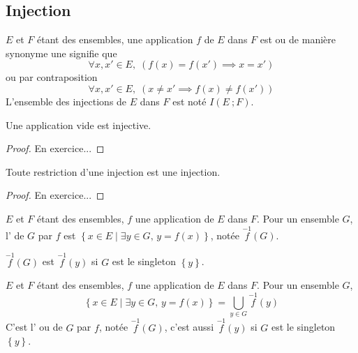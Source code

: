 \subsection{Injection}
\begin{definition}
[Injection]
\(𝐸\) et \(𝐹\) étant des ensembles, une application \(𝑓\) de
\(𝐸\) dans \(𝐹\) est  ou de manière synonyme une
 signifie que
\begin{equation*}
∀𝑥,𝑥'∈𝐸,\;(𝑓(𝑥)=𝑓(𝑥')⟹𝑥=𝑥')
\end{equation*}
ou par contraposition
\begin{equation*}
∀𝑥,𝑥'∈𝐸,\;(𝑥≠𝑥'⟹𝑓(𝑥)≠𝑓(𝑥'))
\end{equation*}
L'ensemble des injections de \(𝐸\) dans \(𝐹\) est noté \(I(𝐸~;𝐹)\).
\end{definition}
%
\begin{theorem}
Une application vide est injective.
\end{theorem}
\begin{proof}
En exercice...
\end{proof}
%
\begin{theorem}
Toute restriction d'une injection est une injection.
\end{theorem}
\begin{proof}
En exercice...
\end{proof}
%
\begin{definition}
\(𝐸\) et \(𝐹\) étant des ensembles, \(𝑓\) une application de \(𝐸\) dans \(𝐹\).
Pour un ensemble \(𝐺\), l' de \(𝐺\) par \(𝑓\) est
\(\left\{𝑥∈𝐸\middle|∃𝑦∈𝐺\text{, }𝑦=𝑓(𝑥)\right\}\),
notée \(\overset{-1}{𝑓}(𝐺)\).
\end{definition}
\begin{remark}
\(\overset{-1}{𝑓}(𝐺)\) est \(\overset{-1}{𝑓}(𝑦)\) si \(𝐺\) est le singleton \(\left\{𝑦\right\}\).
\end{remark}
%
\begin{theorem}
\(𝐸\) et \(𝐹\) étant des ensembles, \(𝑓\) une application de \(𝐸\) dans \(𝐹\).
Pour un ensemble \(𝐺\),
\begin{equation*}
\left\{𝑥∈𝐸\middle|∃𝑦∈𝐺\text{, }𝑦=𝑓(𝑥)\right\}=
\bigcup_{𝑦∈𝐺}\overset{-1}{𝑓}(𝑦)
\end{equation*}
C'est l' ou  de \(𝐺\) par \(𝑓\),
notée \(\overset{-1}{𝑓}(𝐺)\), c'est aussi \(\overset{-1}{𝑓}(𝑦)\) si \(𝐺\)
est le singleton \(\left\{𝑦\right\}\).
\end{theorem}

